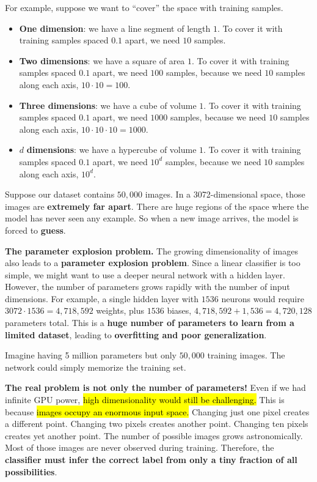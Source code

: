 \highspace
\begin{examplebox}
    For example, suppose we want to ``cover'' the space with training samples.
    \begin{itemize}
        \item \textbf{One dimension}: we have a line segment of length $1$. To cover it with training samples spaced $0.1$ apart, we need $10$ samples.
        \item \textbf{Two dimensions}: we have a square of area $1$. To cover it with training samples spaced $0.1$ apart, we need $100$ samples, because we need $10$ samples along each axis, $10 \cdot 10 = 100$.
        \item \textbf{Three dimensions}: we have a cube of volume $1$. To cover it with training samples spaced $0.1$ apart, we need $1000$ samples, because we need $10$ samples along each axis, $10 \cdot 10 \cdot 10 = 1000$.
        \item $d$ \textbf{dimensions}: we have a hypercube of volume $1$. To cover it with training samples spaced $0.1$ apart, we need $10^d$ samples, because we need $10$ samples along each axis, $10^d$.
    \end{itemize}
    Suppose our dataset contains $50,000$ images. In a 3072-dimensional space, those images are \textbf{extremely far apart}. There are huge regions of the space where the model has never seen any example. So when a new image arrives, the model is forced to \textbf{guess}.
\end{examplebox}

\highspace
\textcolor{Red2}{ \textbf{The parameter explosion problem.}} The growing dimensionality of images also leads to a \textbf{parameter explosion problem}. Since a linear classifier is too simple, we might want to use a deeper neural network with a hidden layer. However, the number of parameters grows rapidly with the number of input dimensions. For example, a single hidden layer with $1536$ neurons would require $3072 \cdot 1536 = 4,718,592$ weights, plus $1536$ biases, $4,718,592 + 1,536 = 4,720,128$ parameters total. This is a \textbf{huge number of parameters to learn from a limited dataset}, leading to \textbf{overfitting and poor generalization}.

\highspace
Imagine having 5 million parameters but only $50,000$ training images. The network could simply memorize the training set.

\newpage

\noindent
\textcolor{Red2}{ \textbf{The real problem is not only the number of parameters!}} Even if we had infinite GPU power, \hl{high dimensionality would still be challenging.} This is because \hl{images occupy an enormous input space.} Changing just one pixel creates a different point. Changing two pixels creates another point. Changing ten pixels creates yet another point. The number of possible images grows astronomically. Most of those images are never observed during training. Therefore, the \textbf{classifier must infer the correct label from only a tiny fraction of all possibilities}.

